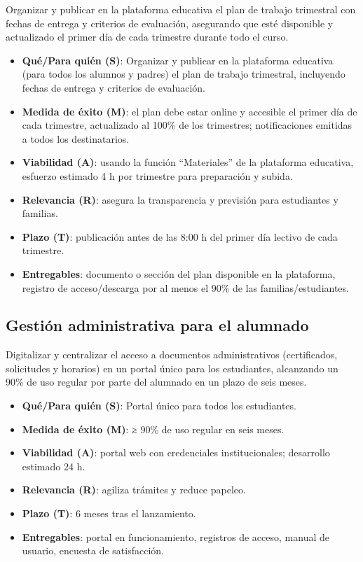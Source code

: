 \documentclass[
  spanish,
  11pt,
]{report}
\providecommand{\tightlist}{%
  \setlength{\itemsep}{0pt}\setlength{\parskip}{0pt}}
\begin{document}
Organizar y publicar en la plataforma educativa el plan de trabajo
trimestral con fechas de entrega y criterios de evaluación, asegurando
que esté disponible y actualizado el primer día de cada trimestre
durante todo el curso.

\begin{itemize}
\tightlist
\item
  \textbf{Qué/Para quién (S)}: Organizar y publicar en la plataforma
  educativa (para todos los alumnos y padres) el plan de trabajo
  trimestral, incluyendo fechas de entrega y criterios de evaluación.
\item
  \textbf{Medida de éxito (M)}: el plan debe estar online y accesible el
  primer día de cada trimestre, actualizado al 100\% de los trimestres;
  notificaciones emitidas a todos los destinatarios.
\item
  \textbf{Viabilidad (A)}: usando la función ``Materiales'' de la
  plataforma educativa, esfuerzo estimado 4 h por trimestre para
  preparación y subida.
\item
  \textbf{Relevancia (R)}: asegura la transparencia y previsión para
  estudiantes y familias.
\item
  \textbf{Plazo (T)}: publicación antes de las 8:00 h del primer día
  lectivo de cada trimestre.
\item
  \textbf{Entregables}: documento o sección del plan disponible en la
  plataforma, registro de acceso/descarga por al menos el 90\% de las
  familias/estudiantes.
\end{itemize}

\subsection{Gestión administrativa para el
alumnado}\label{gestiuxf3n-administrativa-para-el-alumnado}

Digitalizar y centralizar el acceso a documentos administrativos
(certificados, solicitudes y horarios) en un portal único para los
estudiantes, alcanzando un 90\% de uso regular por parte del alumnado en
un plazo de seis meses.

\begin{itemize}
\tightlist
\item
  \textbf{Qué/Para quién (S)}: Portal único para todos los estudiantes.
\item
  \textbf{Medida de éxito (M)}: ≥ 90\% de uso regular en seis meses.
\item
  \textbf{Viabilidad (A)}: portal web con credenciales institucionales;
  desarrollo estimado 24 h.
\item
  \textbf{Relevancia (R)}: agiliza trámites y reduce papeleo.
\item
  \textbf{Plazo (T)}: 6 meses tras el lanzamiento.
\item
  \textbf{Entregables}: portal en funcionamiento, registros de acceso,
  manual de usuario, encuesta de satisfacción.
\end{itemize}
\end{document}
